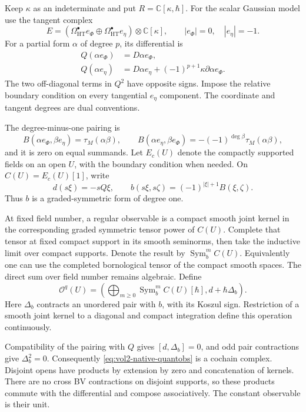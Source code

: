 Keep \(\kappa\) as an indeterminate and put
\(R=\mathbb C[\kappa,\hbar]\). For the scalar Gaussian model use the
tangent complex
\[
 E=\left(\Omega_{\mathrm{HT}}^\bullet e_\Phi
       \oplus\Omega_{\mathrm{HT}}^\bullet e_\eta\right)\otimes\mathbb C[\kappa],
 \qquad |e_\Phi|=0,\quad |e_\eta|=-1.
\]
For a partial form \(\alpha\) of degree \(p\), its differential is
\begin{equation}\label{eq:vol2-native-tangent}
 \begin{split}
 Q(\alpha e_\Phi)&=D\alpha e_\Phi,\\
 Q(\alpha e_\eta)&=D\alpha e_\eta
            +(-1)^{p+1}\kappa\partial\alpha e_\Phi.
 \end{split}
\end{equation}
The two off-diagonal terms in \(Q^2\) have opposite signs. Impose the
relative boundary condition on every tangential \(e_\eta\) component.
The coordinate and tangent degrees are dual conventions.

The degree-minus-one pairing is
\[
 B(\alpha e_\Phi,\beta e_\eta)=\tau_M(\alpha\beta),\qquad
 B(\alpha e_\eta,\beta e_\Phi)
       =-(-1)^{\deg\beta}\tau_M(\alpha\beta),
\]
and it is zero on equal summands. Let \(E_c(U)\) denote the compactly
supported fields on an open \(U\), with the boundary condition when
needed. On \(C(U)=E_c(U)[1]\), write
\[
 d(s\xi)=-sQ\xi,\qquad
 b(s\xi,s\zeta)=(-1)^{|\xi|+1}B(\xi,\zeta).
\]
Thus \(b\) is a graded-symmetric form of degree one.

At fixed field number, a regular observable is a compact smooth joint
kernel in the corresponding graded symmetric tensor power of \(C(U)\).
Complete that tensor at fixed compact support in its smooth seminorms,
then take the inductive limit over compact supports. Denote the result
by \(\operatorname{Sym}_b^m C(U)\). Equivalently one can use the completed
bornological tensor of the compact smooth spaces. The direct sum over
field number remains algebraic. Define
\begin{equation}\label{eq:vol2-native-quantobs}
 \mathcal O^q(U)=
 \left(\bigoplus_{m\geq0}\operatorname{Sym}_b^m C(U)[\hbar],
                       d+\hbar\Delta_b\right).
\end{equation}
Here \(\Delta_b\) contracts an unordered pair with \(b\), with its Koszul
sign. Restriction of a smooth joint kernel to a diagonal and compact
integration define this operation continuously.

Compatibility of the pairing with \(Q\) gives
\([d,\Delta_b]=0\), and odd pair contractions give \(\Delta_b^2=0\).
Consequently \eqref{eq:vol2-native-quantobs} is a cochain complex.
Disjoint opens have products by extension by zero and concatenation of
kernels. There are no cross BV contractions on disjoint supports, so
these products commute with the differential and compose associatively.
The constant observable is their unit.


